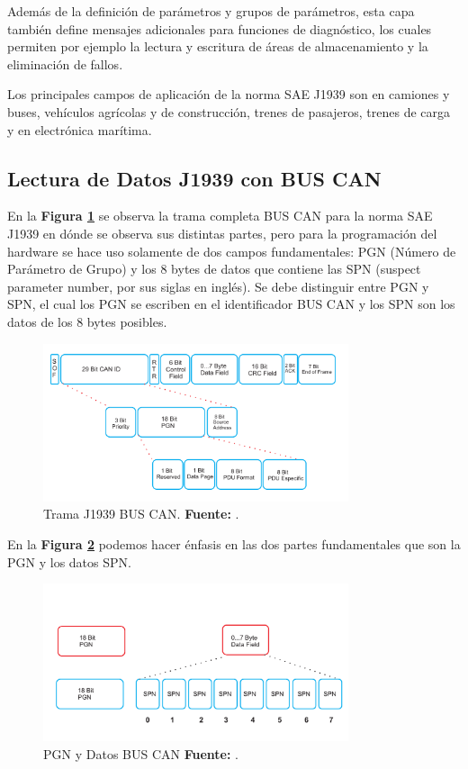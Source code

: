 Además de la definición de parámetros y grupos de parámetros, esta capa también define mensajes adicionales para funciones de diagnóstico, los cuales permiten por ejemplo la lectura y escritura de áreas de almacenamiento y la eliminación de fallos.

Los principales campos de aplicación de la norma SAE J1939 son en camiones y buses, vehículos agrícolas y de construcción, trenes de pasajeros, trenes de carga y en electrónica marítima.


\subsection{Lectura de Datos J1939 con BUS CAN}

En la \textbf{Figura \ref{TB1}} se observa la trama completa BUS CAN para la norma SAE J1939 en dónde se observa sus distintas partes, pero para la programación del hardware se hace uso solamente de dos campos fundamentales: PGN (Número de Parámetro de Grupo) y los 8 bytes de datos que contiene las SPN (suspect parameter number, por sus siglas en inglés).
Se debe distinguir entre PGN y SPN, el cual los PGN se escriben en el identificador BUS CAN y los SPN son los datos de los 8 bytes posibles. 


\begin{figure}[H]
	\centering
	\includegraphics[width=0.8\textwidth]{./Cap5imagen/ID29.pdf}
	\caption[Trama J1939 BUS CAN.]{Trama J1939 BUS CAN.\textbf{ Fuente:} \cite{MCmi}.}
	\label{TB1} %
\end{figure}

En la \textbf{Figura \ref{TB2}} podemos hacer énfasis en las dos partes fundamentales que son la  PGN y los datos SPN.

\begin{figure}[H]
	\centering
	\includegraphics[width=0.8\textwidth]{./Cap5imagen/PGNDAT.pdf}
	\caption[PGN y Datos BUS CAN.]{PGN y Datos BUS CAN\textbf{ Fuente:} \cite{MCmi}.}
	\label{TB2} %
\end{figure}

